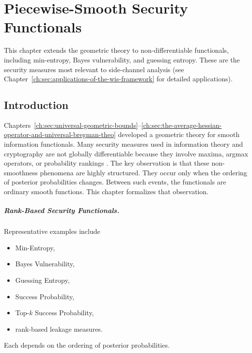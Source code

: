 \chapter[Piecewise-Smooth Functionals]{Piecewise-Smooth Security Functionals}\label{ch:sec:piecewise-smooth}

This chapter extends the geometric theory to non-differentiable functionals, including min-entropy, Bayes vulnerability, and guessing entropy. These are the security measures most relevant to side-channel analysis (see Chapter~\ref{ch:sec:applications-of-the-wis-framework} for detailed applications).


\section{Introduction}\label{ch:sec:introduction-piecewise_smooth}
Chapters~\ref{ch:sec:universal-geometric-bounds}--\ref{ch:sec:the-average-hessian-operator-and-universal-bregman-theo} developed a geometric theory for smooth information
functionals. Many security measures used in information theory and
cryptography are not globally differentiable because they involve
maxima, argmax operators, or probability rankings
\cite{smith2009foundations, malacaria2007assessing,
clark2007static, chatzikokolakis2005probability}.
The key observation is that these non-smoothness phenomena are highly
structured. They occur only when the ordering of posterior probabilities
changes. Between such events, the functionals are ordinary smooth
functions.
This chapter formalizes that observation.
\paragraph{Rank-Based Security Functionals.}
Representative examples include
\begin{itemize}
\item Min-Entropy,
\item Bayes Vulnerability,
\item Guessing Entropy,
\item Success Probability,
\item Top-\(k\) Success Probability,
\item rank-based leakage measures.
\end{itemize}
Each depends on the ordering of posterior probabilities.



